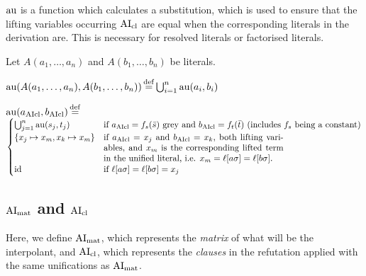 \documentclass[,%
	paper=a4,%
	DIV14, %
	twoside=false,%
	liststotoc,
	bibtotoc,
	draft=false,%
	numbers=noendperiod
]{scrartcl}
\begin{document}
$\operatorname{au}$ is a function which calculates a substitution, which is used to ensure that the lifting variables occurring $\operatorname{AI}_\mathrm{cl}$ are equal when the corresponding literals in the derivation are. This is necessary for resolved literals or factorised literals.

Let $A(a_1, \dotsc, a_n)$ and $A(b_1, \dotsc, b_n)$ be literals.

$\operatorname{au}(A(a_1, \dotsc, a_n), A(b_1, \dotsc, b_n)) \operatorname{\stackrel{\mathrm{def}}{=}} \bigcup_{i=1}^n \operatorname{au}(a_i, b_i)$

$ \aiu (a\fromclause, b\fromclause) \defeq$\newline
$
\begin{cases}
	\bigcup_{j=1}^n \aiu(s_j, t_j) & \text{if $a\cl=f_s(\bar s)$ grey and $b\cl = f_t(\bar t)$ (includes $f_s$ being a constant)} \\
	\{x_j \mapsto x_m, x_k \mapsto x_m\} & \parbox[t]{.6\textwidth}{if $a\cl = x_j$ and $b\cl = x_k$, both lifting variables, and $x_m$ is the corresponding lifted term in the unified literal, i.e. $x_m = \lifboth{a\sigma} = \lifboth{b\sigma}$.
	{\tiny


}}\\
\id & \text{if $\lifboth{a\sigma} = \lifboth{b\sigma} = x_j$ }
\end{cases} $


\subsection{$\operatorname{AI}_\mathrm{mat}$ and $\operatorname{AI}_\mathrm{cl}$}

Here, we define $\operatorname{AI}_\mathrm{mat}$, which represents the \emph{matrix} of what will be the interpolant, and $\operatorname{AI}_\mathrm{cl}$, which represents the \emph{clauses} in the refutation applied with the same unifications as $\operatorname{AI}_\mathrm{mat}$.
\end{document}

